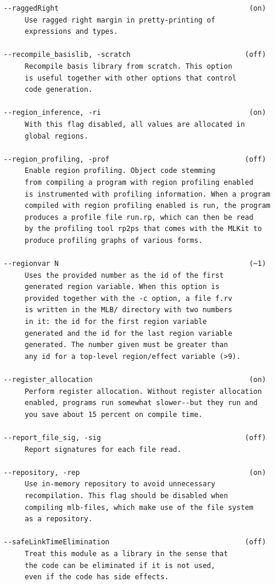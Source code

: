 \documentclass[12pt]{book}
\begin{document}
\begin{verbatim}
--raggedRight                                             (on)
     Use ragged right margin in pretty-printing of
     expressions and types.

--recompile_basislib, -scratch                           (off)
     Recompile basis library from scratch. This option
     is useful together with other options that control
     code generation.

--region_inference, -ri                                   (on)
     With this flag disabled, all values are allocated in
     global regions.

--region_profiling, -prof                                (off)
     Enable region profiling. Object code stemming
     from compiling a program with region profiling enabled
     is instrumented with profiling information. When a program
     compiled with region profiling enabled is run, the program
     produces a profile file run.rp, which can then be read
     by the profiling tool rp2ps that comes with the MLKit to
     produce profiling graphs of various forms.

--regionvar N                                             (~1)
     Uses the provided number as the id of the first
     generated region variable. When this option is
     provided together with the -c option, a file f.rv
     is written in the MLB/ directory with two numbers
     in it: the id for the first region variable
     generated and the id for the last region variable
     generated. The number given must be greater than
     any id for a top-level region/effect variable (>9).

--register_allocation                                     (on)
     Perform register allocation. Without register allocation
     enabled, programs run somewhat slower--but they run and
     you save about 15 percent on compile time.

--report_file_sig, -sig                                  (off)
     Report signatures for each file read.

--repository, -rep                                        (on)
     Use in-memory repository to avoid unnecessary
     recompilation. This flag should be disabled when
     compiling mlb-files, which make use of the file system
     as a repository.

--safeLinkTimeElimination                                (off)
     Treat this module as a library in the sense that
     the code can be eliminated if it is not used,
     even if the code has side effects.


\end{verbatim}
\end{document}

